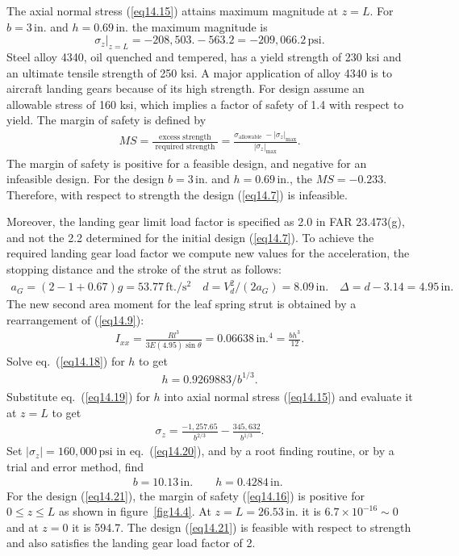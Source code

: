 \documentclass{AeroStructure-ERJohnson}
\begin{document}
\noindent The axial normal stress (\ref{eq14.15}) attains maximum magnitude at $z = {L}$. For $b = 3$\,in. and $h = 0.69$\,in. the maximum magnitude is
\[
\left.\sigma_{z}\right|_{z=L}=-208{,}503.-563.2=-209{,}066.2\,\mathrm{psi}.
\]
Steel alloy 4340, oil quenched and tempered, has a yield strength of 230 ksi and an ultimate tensile strength of 250 ksi. A major application of alloy 4340 is to aircraft landing gears because of its high strength. For design assume an allowable stress of 160 ksi, which implies a factor of safety of 1.4 with respect to yield. The margin of safety is defined by
\begin{align}\label{eq14.16}
M S=\frac{\text{ excess strength }}{\text{ required strength }}=\frac{\sigma_{\text{allowable }}-\left|\sigma_{z}\right|_{\max }}{\left|\sigma_{z}\right|_{\max }}.
\end{align}
The margin of safety is positive for a feasible design, and negative for an infeasible design. For the design $b = 3$\,in. and $h = 0.69$\,in., the $M S=-0.233$. Therefore, with respect to strength the design (\ref{eq14.7}) is infeasible.

Moreover, the landing gear limit load factor is specified as 2.0 in FAR 23.473(g), and not the 2.2 determined for the initial design (\ref{eq14.7}). To achieve the required landing gear load factor we compute new values for the acceleration, the stopping distance and the stroke of the strut as follows:
\begin{align}\label{eq14.17}
a_{G}=(2-1+0.67) g=53.77\,\mathrm{ft.}/\mathrm{s}^{2} \quad d=V_{d}^{2} /\left(2 a_{G}\right)=8.09\,\mathrm{in}. \quad \Delta=d-3.14=4.95\,\mathrm{in.}
\end{align}
The new second area moment for the leaf spring strut is obtained by a rearrangement of (\ref{eq14.9}):
\begin{align}\label{eq14.18}
I_{x x}=\frac{R l^{3}}{3 E(4.95) \sin \theta}=0.06638\,\text{in.}{}^{4}=\frac{b h^{3}}{12}.
\end{align}
Solve eq.~(\ref{eq14.18}) for $h$ to get
\begin{align}\label{eq14.19}
h=0.9269883/b^{1/3}.
\end{align}
Substitute eq.~(\ref{eq14.19}) for $h$ into axial normal stress (\ref{eq14.15}) and evaluate it at $z = \textit{L}$ to get
\begin{align}\label{eq14.20}
\sigma_{z}=\frac{-1,257.65}{b^{2/3}}-\frac{345,632}{b^{1/3}}.
\end{align}
Set $\left|\sigma_{z}\right|=160{,}000\,\mathrm{psi}$ in eq.~(\ref{eq14.20}), and by a root finding routine, or by a trial and error method, find
\begin{align}\label{eq14.21}
b=10.13\,\text{in.}\qquad h=0.4284\,\text{in. }
\end{align}
For the design (\ref{eq14.21}), the margin of safety (\ref{eq14.16}) is positive for $0 \leq z \leq L$ as shown in figure~\ref{fig14.4}. At $z=L=26.53\,\mathrm{in.}$ it is $6.7 \times 10^{-16} \sim 0$ and at $z = 0$ it is 594.7. The design (\ref{eq14.21}) is feasible with respect to strength and also satisfies the landing gear load factor of 2.
\end{document}
